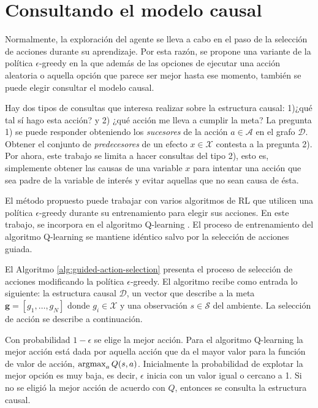 \section{Consultando el modelo causal}

Normalmente, la exploración del agente se lleva a cabo en el paso de la selección de acciones
durante su aprendizaje. Por esta razón,
se propone una variante de la política $\epsilon$-greedy en la que además de las opciones de ejecutar
una acción aleatoria o aquella opción que parece ser mejor hasta ese momento, también se puede elegir consultar el modelo causal. 

Hay dos tipos de consultas que interesa realizar 
sobre la estructura causal: 1)¿qué tal sí hago esta acción?
y 2) ¿qué acción me lleva a cumplir la meta?
La pregunta 1) se puede responder
obteniendo los \textit{sucesores} de la acción $a\in \mathcal{A}$
en el grafo $\mathcal{D}$. Obtener el conjunto de \textit{predecesores} de un efecto $x \in \mathcal{X}$ contesta
a la pregunta 2). Por ahora, este trabajo se limita a hacer consultas del tipo 2), esto es,
simplemente obtener las causas de una variable $x$ para intentar una acción que
sea padre de la variable de interés y evitar aquellas que no sean causa de ésta.

El método propuesto puede trabajar con varios algoritmos
 de RL que utilicen una política $\epsilon$-greedy 
 durante su entrenamiento para elegir sus acciones. En
 este trabajo, se incorpora en el algoritmo Q-learning \cite{watkins1992q}. El proceso de entrenamiento 
 del algoritmo Q-learning se mantiene idéntico salvo por
 la selección de acciones guiada.

El Algoritmo \ref{alg:guided-action-selection} presenta el proceso 
de selección de acciones modificando la política
$\epsilon$-greedy.
El algoritmo recibe como entrada lo siguiente: la estructura causal $\mathcal{D}$, un vector que describe a la meta $\mathbf{g} = [g_1, \dots, g_N]$ donde $g_i \in \mathcal{X}$ y una observación $s \in \mathcal{S}$ del ambiente. La selección de acción se describe a continuación. 

Con probabilidad $1-\epsilon$ se elige la mejor acción. Para el algoritmo Q-learning la mejor acción está dada por aquella acción que da el mayor valor para la función de valor de acción, $\operatorname*{argmax}_a Q(s, a)$.
Inicialmente la probabilidad de
explotar la mejor opción es muy baja, es decir, $\epsilon$ inicia con un valor igual o cercano a 1.
Si no se eligió la mejor acción de acuerdo con $Q$, entonces se consulta la estructura causal.

